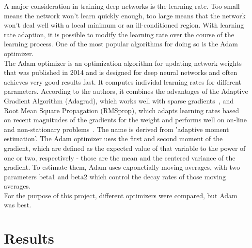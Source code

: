 \documentclass[
	a4paper,
	pagesize,
	pdftex,
	12pt,
	twoside, %
	BCOR=5mm, %
	ngerman,
	fleqn,
	final,
	]{scrartcl}
\begin{document}
A major consideration in training deep networks is the learning rate. Too small means the network won't learn quickly enough, too large means that the network won't deal well with a local minimum or an ill-conditioned region. With learning rate adaption, it is possible to modify the learning rate over the course of the learning process. One of the most popular algorithms for doing so is the Adam optimizer.\\
The Adam optimizer is an optimization algorithm for updating network weights that was published in 2014 \cite{Kingma.2014}
and is designed for deep neural networks and often achieves very good results fast. It computes individal learning rates for different parameters. According to the authors, it combines the advantages of the Adaptive Gradient Algorithm (Adagrad), which works well with sparse gradients~\cite{Duchi.2011}, and Root Mean Square Propagation (RMSprop), which adapts learning rates based on recent magnitudes of the gradients for the weight and performs well on on-line and non-stationary problems~\cite{Tieleman.2012}. The name is derived from 'adaptive moment estimation'. The Adam optimizer uses the first and second moment of the gradient, which are defined as the expected value of that variable to the power of one or two, respectively - those are the mean and the centered variance of the gradient. To estimate them, Adam uses exponetially moving averages, with two parameters beta1 and beta2 which control the decay rates of those moving averages. \\
For the purpose of this project, different optimizers were compared, but Adam was best. %









\newpage

\section{Results}
\end{document}
